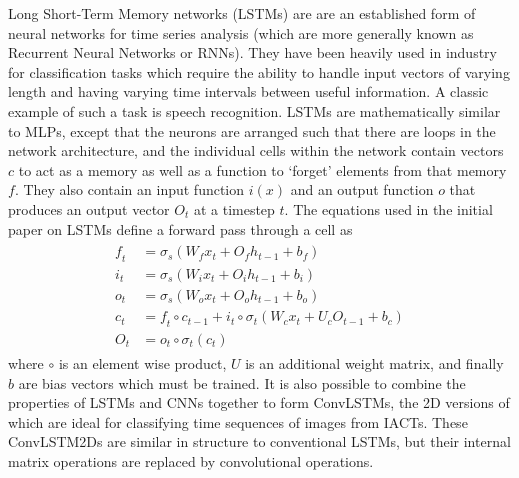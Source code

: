 Long Short-Term Memory networks (LSTMs) are are an established form of neural networks for time series analysis (which are more generally known as Recurrent Neural Networks or RNNs). They have been heavily used in industry for classification tasks which require the ability to handle input vectors of varying length and having varying time intervals between useful information. A classic example of such a task is speech recognition.
LSTMs are mathematically similar to MLPs, except that the neurons are arranged such that there are loops in the network architecture, and the individual cells within the network contain vectors $\textit{c}$ to act as a memory as well as a function to `forget' elements from that memory $\textit{f}$. They also contain an input function $\textit{i}(x)$ and an output function $\textit{o}$ that produces an output vector $O_t$ at a timestep $t$. The equations used in the initial paper on LSTMs define a forward pass through a cell \cite{Hochreiter} as
\begin{align}
\begin{split}
\textit{f}_t &= \sigma_s(W_{f} x_t + O_{f} h_{t-1} + b_f) \\
\textit{i}_t &= \sigma_s(W_{i} x_t + O_{i} h_{t-1} + b_i) \\
\textit{o}_t &= \sigma_s(W_{o} x_t + O_{o} h_{t-1} + b_o) \\
\textit{c}_t &= \textit{f}_t \circ c_{t-1} + \textit{i}_t \circ \sigma_t(W_{c} x_t + U_{c} O_{t-1} + b_c) \\
O_t &= o_t \circ \sigma_t(\textit{c}_t)
\end{split}
\end{align}
where $\circ$ is an element wise product, $U$ is an additional weight matrix, and finally $b$ are bias vectors which must be trained. It is also possible to combine the properties of LSTMs and CNNs together to form ConvLSTMs, the 2D versions of which are ideal for classifying time sequences of images from IACTs. These ConvLSTM2Ds are similar in structure to conventional LSTMs, but their internal matrix operations are replaced by convolutional operations. 
